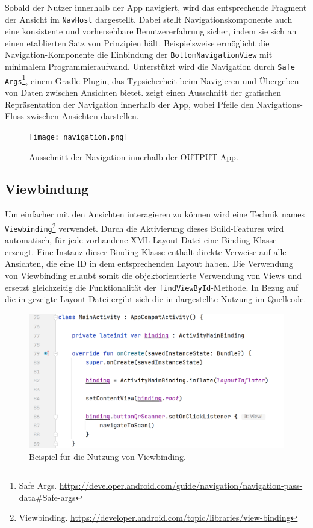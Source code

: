 Sobald der Nutzer innerhalb der App navigiert, wird das entsprechende Fragment der Ansicht im \texttt{NavHost} dargestellt. Dabei stellt Navigationskomponente auch eine konsistente und vorhersehbare Benutzererfahrung sicher, indem sie sich an einen etablierten Satz von Prinzipien hält. Beispielsweise ermöglicht die Navigation-Komponente die Einbindung der \texttt{BottomNavigationView} mit minimalem Programmieraufwand. Unterstützt wird die Navigation durch \texttt{Safe Args}\footnote{Safe Args. \url{https://developer.android.com/guide/navigation/navigation-pass-data\#Safe-args}}, einem Gradle-Plugin, das Typsicherheit beim Navigieren und Übergeben von Daten zwischen Ansichten bietet.  zeigt einen Ausschnitt der grafischen Repräsentation der Navigation innerhalb der App, wobei Pfeile den Navigations-Fluss zwischen Ansichten darstellen.   

\begin{figure}[H]
  \texttt{[image: navigation.png]}
  \caption{Ausschnitt der Navigation innerhalb der OUTPUT-App.}\label{fig:navigation}
\end{figure}


\subsection{Viewbindung}

Um einfacher mit den Ansichten interagieren zu können wird eine Technik names \texttt{Viewbinding}\footnote{Viewbinding. \url{https://developer.android.com/topic/libraries/view-binding}} verwendet. Durch die Aktivierung dieses Build-Features wird automatisch, für jede vorhandene XML-Layout-Datei eine Binding-Klasse erzeugt. Eine Instanz dieser Binding-Klasse enthält direkte Verweise auf alle Ansichten, die eine ID in dem entsprechenden Layout haben. Die Verwendung von Viewbinding erlaubt somit die objektorientierte Verwendung von Views und ersetzt gleichzeitig die Funktionalität der \texttt{findViewById}-Methode. In Bezug auf die in  gezeigte Layout-Datei ergibt sich die in  dargestellte Nutzung im Quellcode.

\begin{figure}[H]
    \includegraphics[width=1\linewidth]{viewbinding.png}
    \caption{Beispiel für die Nutzung von Viewbinding.}\label{fig:viewbinding}
\end{figure}

